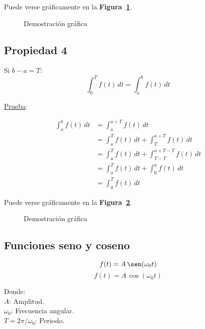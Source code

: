 Puede verse gráficamente en la \textbf{Figura~\ref{figura_04}}.

\begin{figure}[H]
    \centering
    
    \caption{Demostración gráfica}\label{figura_04}
\end{figure}

\subsection*{Propiedad 4}

Si $b-a=T$:
\begin{equation}
    \int_{0}^{T} f(t)\,dt=\int_{a}^{b} f(t)\,dt
\label{propiedad4}
\end{equation}

\underline{Prueba}:

\begin{equation*}
\begin{split}
    \int_{a}^{b} f(t)\,dt
        &=\int_{a}^{a+T} f(t)\,dt\\
        &=\int_{a}^{T} f(t)\,dt+\int_{T}^{a+T} f(t)\,dt\\
        &=\int_{a}^{T} f(t)\,dt+\int_{T-T}^{a+T-T} f(t)\,dt\\
        &=\int_{a}^{T} f(t)\,dt+\int_{0}^{a} f(t)\,dt\\
        &=\int_{0}^{T} f(t)\,dt
\end{split}
\end{equation*}

Puede verse gráficamente en la \textbf{Figura~\ref{figura_05}}.

\begin{figure}[H]
    \centering
    
    \caption{Demostración gráfica}\label{figura_05}
\end{figure}

\subsection{Funciones seno y coseno}

\begin{equation*}
    f(t)=A\,\sen(\omega_0 t)
\end{equation*}
\begin{equation*}
    f(t)=A\,\cos(\omega_0 t)
\end{equation*}

Donde:\\
\indent\indent$A$: Amplitud.\\
\indent\indent$\omega_0$: Frecuencia angular.\\
\indent\indent$T=2\pi/\omega_0$: Periodo.\\


